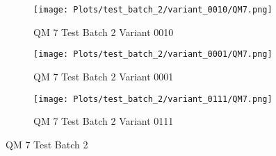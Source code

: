 \documentclass{DissertateFigs}
\begin{document}
\begin{figure}[t!]
\medskip

    \begin{subfigure}{0.47\textwidth}
    \texttt{[image: Plots/test\_batch\_2/variant\_0010/QM7.png]}
    \caption{QM 7 Test Batch 2 Variant 0010}
    \end{subfigure}
    \begin{subfigure}{0.47\textwidth}
    \texttt{[image: Plots/test\_batch\_2/variant\_0001/QM7.png]}
    \caption{QM 7 Test Batch 2 Variant 0001}
    \end{subfigure}

\medskip

    \begin{subfigure}{0.47\textwidth}
    \texttt{[image: Plots/test\_batch\_2/variant\_0111/QM7.png]}
    \caption{QM 7 Test Batch 2 Variant 0111}
    \end{subfigure}
\caption{QM 7 Test Batch 2}
    \end{figure}
\clearpage
\end{document}
